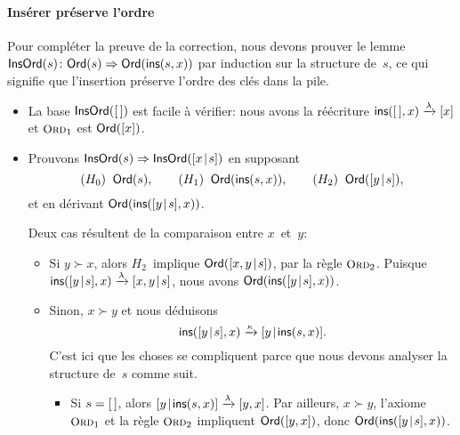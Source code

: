 \paragraph{Insérer préserve l'ordre}

Pour compléter la preuve de la correction, nous devons prouver le
lemme~\(\textsf{InsOrd}({s}) \colon \textsf{Ord}({s}) \Rightarrow
\textsf{Ord}({\textsf{ins}(s,x)})\) par induction sur la
structure de~\(s\), ce qui signifie que
l'insertion préserve l'ordre des clés dans la pile.
\begin{itemize}

  \item La base \(\textsf{InsOrd}({[\,]})\) est facile à vérifier: nous avons
  la réécriture \(\textsf{ins}([\,],x) \xrightarrow{\smash{\lambda}} [x]\)
  et \(\TirName{Ord}_1\) est \(\textsf{Ord}({[x]})\).

  \item Prouvons \(\textsf{InsOrd}({s}) \Rightarrow
    \textsf{InsOrd}({[{x}\!\mid\!{s}]})\) en supposant
    \begin{equation*}
      (H_0) \;\; \textsf{Ord}({s}),\qquad
      (H_1) \;\; \textsf{Ord}({\textsf{ins}(s,x)}),\qquad
      (H_2) \;\; \textsf{Ord}({[{y}\!\mid\!{s}]}),
    \end{equation*}
    et en dérivant \(\textsf{Ord}({\textsf{ins}([{y}\!\mid\!{s}],x)})\).

    \noindent Deux cas résultent de la comparaison entre \(x\)~et~\(y\):
    \begin{itemize}

      \item Si \(y \succ x\), alors \(H_2\)~implique
      \(\textsf{Ord}({[{x,y}\!\mid\!{s}]})\), par la règle
      \(\TirName{Ord}_2\). Puisque \(\textsf{ins}([{y}\!\mid\!{s}],x)
      \xrightarrow{\smash{\lambda}} [{x,y}\!\mid\!{s}]\), nous avons
      \(\textsf{Ord}({\textsf{ins}([{y}\!\mid\!{s}],x)})\).

      \item Sinon, \(x \succ y\) et nous déduisons
      \begin{equation}
        \textsf{ins}([{y}\!\mid\!{s}],x) \xrightarrow{\smash{\kappa}}
        [{y}\!\mid\!{\textsf{ins}(s,x)}].\label{eq:A}
      \end{equation}
      C'est ici que les choses se compliquent parce que nous devons
      analyser la structure de~\(s\) comme suit.
      \begin{itemize}

      \item Si \(s=[\,]\), alors \([{y}\!\mid\!{\textsf{ins}(s,x)}]
        \xrightarrow{\smash{\lambda}} [y,x]\). Par ailleurs, \(x \succ
        y\), l'axiome \(\TirName{Ord}_1\) et la règle
        \(\TirName{Ord}_2\) impliquent \(\textsf{Ord}({[y,x]})\), donc
        \(\textsf{Ord}({\textsf{ins}([{y}\!\mid\!{s}],x)})\).


\end{itemize}
\end{itemize}
\end{itemize}
